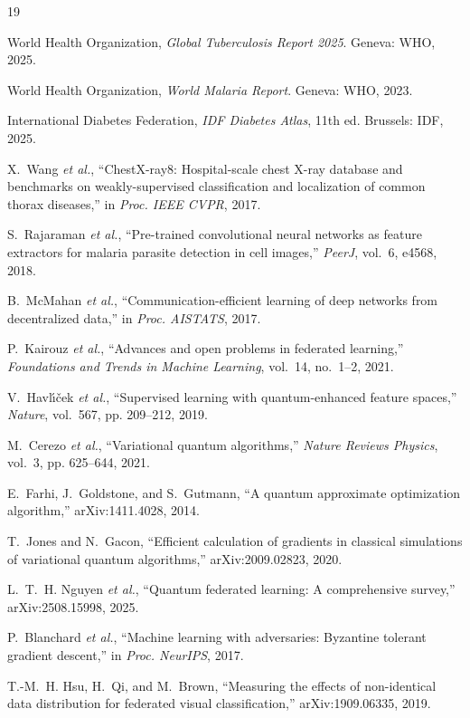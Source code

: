 \documentclass[conference]{IEEEtran}
\begin{document}
\footnotesize
\begin{thebibliography}{19}

 World Health Organization, \emph{Global Tuberculosis Report 2025}. Geneva: WHO, 2025.

 World Health Organization, \emph{World Malaria Report}. Geneva: WHO, 2023.

 International Diabetes Federation, \emph{IDF Diabetes Atlas}, 11th ed. Brussels: IDF, 2025.

 X.~Wang \emph{et al.}, ``ChestX-ray8: Hospital-scale chest
X-ray database and benchmarks on weakly-supervised classification and
localization of common thorax diseases,'' in \emph{Proc. IEEE CVPR}, 2017.

 S.~Rajaraman \emph{et al.}, ``Pre-trained convolutional
neural networks as feature extractors for malaria parasite detection in cell
images,'' \emph{PeerJ}, vol.~6, e4568, 2018.

 B.~McMahan \emph{et al.}, ``Communication-efficient learning
of deep networks from decentralized data,'' in \emph{Proc. AISTATS}, 2017.

 P.~Kairouz \emph{et al.}, ``Advances and open problems in
federated learning,'' \emph{Foundations and Trends in Machine Learning},
vol.~14, no.~1--2, 2021.

 V.~Havl\'{\i}\v{c}ek \emph{et al.}, ``Supervised learning
with quantum-enhanced feature spaces,'' \emph{Nature}, vol.~567, pp. 209--212, 2019.

 M.~Cerezo \emph{et al.}, ``Variational quantum algorithms,''
\emph{Nature Reviews Physics}, vol.~3, pp. 625--644, 2021.

 E.~Farhi, J.~Goldstone, and S.~Gutmann, ``A quantum
approximate optimization algorithm,'' arXiv:1411.4028, 2014.

 T.~Jones and N.~Gacon, ``Efficient calculation of gradients in
classical simulations of variational quantum algorithms,'' arXiv:2009.02823, 2020.

 L.~T.~H. Nguyen \emph{et al.}, ``Quantum federated
learning: A comprehensive survey,'' arXiv:2508.15998, 2025.

 P.~Blanchard \emph{et al.}, ``Machine learning with
adversaries: Byzantine tolerant gradient descent,'' in \emph{Proc. NeurIPS}, 2017.

 T.-M.~H. Hsu, H.~Qi, and M.~Brown, ``Measuring the effects of
non-identical data distribution for federated visual classification,''
arXiv:1909.06335, 2019.


\end{thebibliography}
\end{document}
